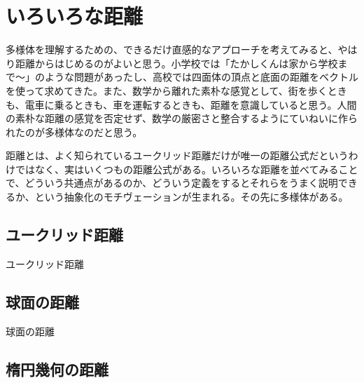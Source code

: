 \maketitle

\newpage


\section{ いろいろな距離 }

多様体を理解するための、できるだけ直感的なアプローチを考えてみると、やはり距離からはじめるのがよいと思う。小学校では「たかしくんは家から学校まで〜」のような問題があったし、高校では四面体の頂点と底面の距離をベクトルを使って求めてきた。また、数学から離れた素朴な感覚として、街を歩くときも、電車に乗るときも、車を運転するときも、距離を意識していると思う。人間の素朴な距離の感覚を否定せず、数学の厳密さと整合するようにていねいに作られたのが多様体なのだと思う。

距離とは、よく知られているユークリッド距離だけが唯一の距離公式だというわけではなく、実はいくつもの距離公式がある。いろいろな距離を並べてみることで、どういう共通点があるのか、どういう定義をするとそれらをうまく説明できるか、という抽象化のモチヴェーションが生まれる。その先に多様体がある。

\newpage


\subsection{ ユークリッド距離 }

ユークリッド距離

\newpage


\subsection{ 球面の距離 }

球面の距離

\newpage


\subsection{ 楕円幾何の距離 }

